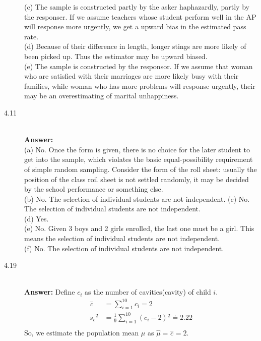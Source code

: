 \documentclass{article}
\begin{document}
\begin{description}
        (c) The sample is constructed partly by the asker haphazardly, partly by the responser. If we assume teachers whose student perform well in the AP will response more urgently, we get a upward bias in the estimated pass rate.\\
        (d) Because of their difference in length, longer stings are more likely of been picked up. Thus the estimator may be upward biased. \\
        (e) The sample is constructed by the responsor. If we assume that woman who are satisfied with their marriages are more likely busy with their families, while woman who has more problems will response urgently, their may be an overestimating of marital unhappiness.   \\
    \item[4.11 ] \hfill \\
        {\bf Answer:}\\
        (a) No. Once the form is given, there is no choice for the later student to get into the sample, which violates the basic equal-possibility requirement of simple random sampling. Consider the form of the roll sheet: usually the position of the class roil sheet is not settled randomly, it may be decided by the school performance or something else.\\
        (b) No. The selection of individual students are not independent.
        (c) No. The selection of individual students are not independent.\\
        (d) Yes.\\
        (e) No. Given 3 boys and 2 girls enrolled, the last one must be a girl. This means the selection of individual students are not independent.\\
        (f) No. The selection of individual students are not independent.\\
    \item[4.19 ] \hfill \\
        {\bf Answer:} Define $c_i$ as the number of cavities(cavity) of child $i$.\\
            \begin{align}
            \overset{-}{c}&=\sum _{i=1}^{10} c_i=2 \\
            s_c{}^2&=\frac{1}{9}\sum _{i=1}^{10} \left(c_i-2\right){}^2\doteq 2.22\\
            \end{align}
            So, we estimate the population mean $\mu$ as $\hat{\mu }=\overset{-}{c}=2$.\\

\end{description}
\end{document}
